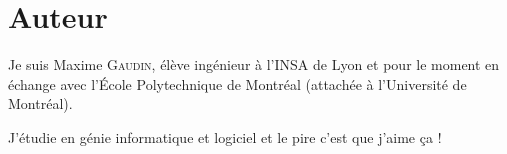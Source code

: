 \section{Auteur}
Je suis Maxime \textsc{Gaudin}, élève ingénieur à l'INSA de Lyon et pour le
moment en échange avec l'École Polytechnique de Montréal (attachée à l'Université de
Montréal).

J'étudie en génie informatique et logiciel et le pire c'est que j'aime ça !

